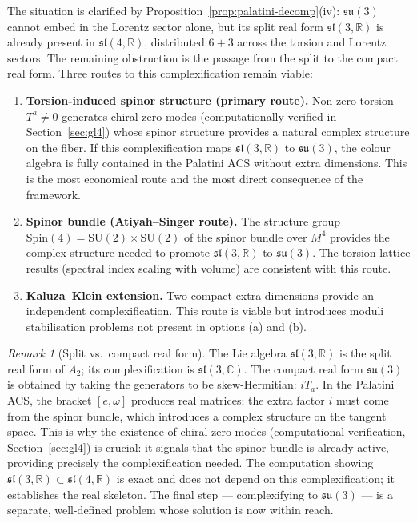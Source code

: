 \documentclass[11pt,a4paper]{article}
\theoremstyle{plain}
\theoremstyle{definition}
\theoremstyle{remark}
\newtheorem{remark}[theorem]{Remark}
\begin{document}
\noindent The situation is clarified by Proposition~\ref{prop:palatini-decomp}(iv):
$\mathfrak{su}(3)$ cannot embed in the Lorentz sector alone, but its split
real form $\mathfrak{sl}(3,\mathbb{R})$ is already present in $\mathfrak{sl}(4,\mathbb{R})$,
distributed $6+3$ across the torsion and Lorentz sectors.  The remaining
obstruction is the passage from the split to the compact real form.
Three routes to this complexification remain viable:

\begin{enumerate}[label=(\alph*)]
  \item \textbf{Torsion-induced spinor structure (primary route).}
    Non-zero torsion $T^a \neq 0$ generates chiral zero-modes
    (computationally verified in Section~\ref{sec:gl4}) whose spinor structure provides a natural
    complex structure on the fiber.  If this complexification maps
    $\mathfrak{sl}(3,\mathbb{R})$ to $\mathfrak{su}(3)$, the colour
    algebra is fully contained in the Palatini ACS without extra dimensions.
    This is the most economical route and the most direct
    consequence of the framework.

  \item \textbf{Spinor bundle (Atiyah--Singer route).}
    The structure group $\mathrm{Spin}(4) = \mathrm{SU}(2) \times \mathrm{SU}(2)$
    of the spinor bundle over $M^4$ provides the complex structure
    needed to promote $\mathfrak{sl}(3,\mathbb{R})$ to $\mathfrak{su}(3)$.
    The torsion lattice results (spectral index scaling with volume)
    are consistent with this route.

  \item \textbf{Kaluza--Klein extension.}
    Two compact extra dimensions provide an independent complexification.
    This route is viable but introduces moduli stabilisation problems
    not present in options (a) and (b).
\end{enumerate}

\begin{remark}[Split vs.\ compact real form]\label{rem:split-compact}
The Lie algebra $\mathfrak{sl}(3,\mathbb{R})$ is the split real form of $A_2$;
its complexification is $\mathfrak{sl}(3,\mathbb{C})$.
The compact real form $\mathfrak{su}(3)$ is obtained by taking the generators
to be skew-Hermitian: $iT_a$.  In the Palatini ACS, the bracket $[e,\omega]$
produces real matrices; the extra factor $i$ must come from the spinor bundle,
which introduces a complex structure on the tangent space.  This is why
the existence of chiral zero-modes (computational verification,
Section~\ref{sec:gl4}) is crucial:
it signals that the spinor bundle is already active, providing precisely
the complexification needed.  The computation showing
$\mathfrak{sl}(3,\mathbb{R}) \subset \mathfrak{sl}(4,\mathbb{R})$ is exact
and does not depend on this complexification; it establishes the real skeleton.
The final step --- complexifying to $\mathfrak{su}(3)$ --- is a separate,
well-defined problem whose solution is now within reach.
\end{remark}
\end{document}
